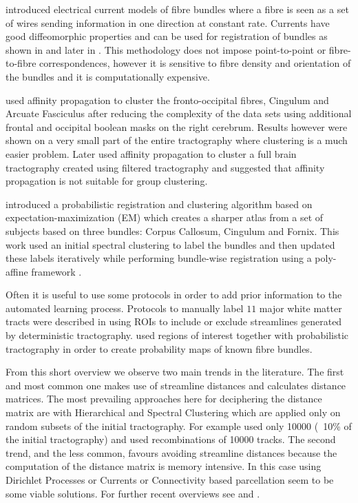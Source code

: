 \documentclass{bioinfo}
\begin{document}
\citet{Durrleman2009} introduced electrical current models of fibre
bundles where a fibre is seen as a set of wires sending information in
one direction at constant rate. Currents have good diffeomorphic
properties and can be used for registration of bundles as shown in
\citet{Durrleman2009} and later in \citet{durrleman2010registration}.
This methodology does not impose point-to-point or fibre-to-fibre
correspondences, however it is sensitive to fibre density and
orientation of the bundles and it is computationally expensive.

\citet*{leemans17new} used affinity propagation to cluster the
fronto-occipital fibres, Cingulum and Arcuate Fasciculus after reducing
the complexity of the data sets using additional frontal and occipital
boolean masks on the right cerebrum. Results however were shown on a
very small part of the entire tractography where clustering is a much
easier problem.  Later \citet{malcolm2009filtered} used affinity
propagation to cluster a full brain tractography created using filtered
tractography and suggested that affinity propagation is not suitable for
group clustering.

\citet{ziyan2009consistency} introduced a probabilistic registration and
clustering algorithm based on expectation-maximization (EM) which
creates a sharper atlas from a set of subjects based on three bundles:
Corpus Callosum, Cingulum and Fornix. This work used an initial
spectral clustering \citep{ODonnell_IEEETMI07} to label the bundles and
then updated these labels iteratively while performing bundle-wise
registration using a poly-affine framework \citep{Arsigny2009}.

Often it is useful to use some protocols in order to add prior
information to the automated learning process. Protocols to manually
label $11$ major white matter tracts were described in
\citet{Wakana2007NeuroImage} using ROIs to include or exclude
streamlines generated by deterministic tractography.
\citet{Hua2008NeuroImage} used regions of interest together with
probabilistic tractography in order to create probability maps of known
fibre bundles.

From this short overview we observe two main trends in the literature.
The first and most common one makes use of streamline distances and
calculates distance matrices. The most prevailing approaches here for
deciphering the distance matrix are with Hierarchical and Spectral
Clustering which are applied only on random subsets of the initial
tractography. For example  \citet{ODonnell_IEEETMI07} used only \num{10000} (~10\% of the initial tractography) and \citet{Visser2010} used recombinations of \num{10000} tracks. The second trend, and the less common, favours avoiding
streamline distances because the computation of the distance matrix is
memory intensive. In this case using Dirichlet Processes or Currents or
Connectivity based parcellation seem to be some viable solutions. For
further recent overviews see \citet{ODonnell_IEEETMI07} and
\citet{wang2010tractography}.
\end{document}
